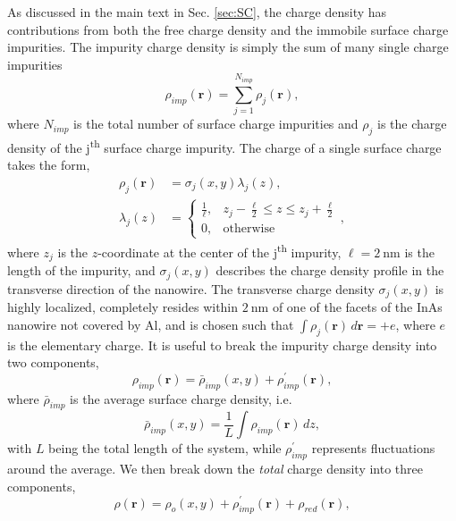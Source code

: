 \documentclass[aps,prmaterials,twocolumn,superscriptaddress,longbibliography]{revtex4-2}
\begin{document}
As discussed in the main text in Sec. \ref{sec:SC}, the charge density has contributions from both the free charge density and the immobile surface charge impurities. The impurity charge density is simply the sum of many single charge impurities
\begin{equation}
    \rho_{imp}(\mathbf{r}) = \sum_{j = 1}^{N_{imp}} 
    \rho_j (\mathbf{r}),
\end{equation}
where $N_{imp}$ is the total number of surface charge impurities and $\rho_j$ is the charge density of the j\textsuperscript{th} surface charge impurity. The charge of a single surface charge takes the form,
\begin{align}
    \rho_j (\mathbf{r}) &= \sigma_j(x,y) \lambda_j(z), \\
   \lambda_j(z) &=
    \begin{cases}
    \frac{1}{\ell}, & z_j - \frac{\ell}{2} \leq z \leq z_j + \frac{\ell}{2} \\
    0, & \text{otherwise}
    \end{cases},
\end{align}
where $z_j$ is the $z$-coordinate at the center of the j\textsuperscript{th} impurity, $\ell = 2~\text{nm}$ is the length of the impurity, and $\sigma_j(x,y)$ describes the charge density profile in the transverse direction of the nanowire. The transverse charge density $\sigma_j(x,y)$ is highly localized, completely resides within $2~\text{nm}$ of one of the facets of the InAs nanowire not covered by Al, and is chosen such that $ \int \rho_j(\mathbf{r})\, d\mathbf{r} = +e$, where $e$ is the elementary charge. 
It is useful to break the impurity charge density into two components,
\begin{equation}
    \rho_{imp}(\mathbf{r}) = \bar{\rho}_{imp}(x,y) + \rho_{imp}^\prime(\mathbf{r}), \label{RhoImpDecomp}
\end{equation}    
where $\bar{\rho}_{imp}$ is the average surface charge density, i.e. 
\begin{equation}
    \bar{\rho}_{imp}(x,y) = \frac{1}{L}\int \rho_{imp}(\mathbf{r}) \, dz,
\end{equation}
with $L$ being the total length of the system, while $\rho_{imp}^\prime$ represents fluctuations around the average. We then break down the \textit{total} charge density into three components,
\begin{equation}
    \rho(\mathbf{r}) = \rho_o(x,y) + \rho_{imp}^\prime(\mathbf{r}) + \rho_{red}(\mathbf{r}),
\end{equation}
\end{document}
